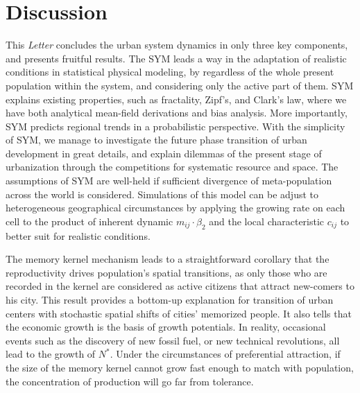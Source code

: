 \documentclass[reprint,unsortedaddress,amsmath,amssymb,aps,prl,showkeys]{revtex4-2}
\begin{document}
\section{Discussion}
This \emph{Letter} concludes the urban system dynamics in only three key components, and presents fruitful results. The SYM leads a way in the adaptation of realistic conditions in statistical physical modeling, by regardless of the whole present population within the system, and considering only the active part of them. SYM explains existing properties, such as fractality, Zipf's, and Clark's law, where we have both analytical mean-field derivations and bias analysis. More importantly, SYM predicts regional trends in a probabilistic perspective. With the simplicity of SYM, we manage to investigate the future phase transition of urban development in great details, and explain dilemmas of the present stage of urbanization through the competitions for systematic resource and space. The assumptions of SYM are well-held if sufficient divergence of meta-population across the world is considered. Simulations of this model can be adjust to heterogeneous geographical circumstances by applying the growing rate on each cell to the product of inherent dynamic $m_{ij}\cdot \beta_2$ and the local characteristic $c_{ij}$ to better suit for realistic conditions.

The memory kernel mechanism leads to a straightforward corollary that the reproductivity drives population's spatial transitions, as only those who are recorded in the kernel are considered as active citizens that attract new-comers to his city. This result provides a bottom-up explanation for transition of urban centers with stochastic spatial shifts of cities' memorized people. It also tells that the economic growth is the basis of growth potentials. In reality, occasional events such as the discovery of new fossil fuel, or new technical revolutions, all lead to the growth of $N^*$. Under the circumstances of preferential attraction, if the size of the memory kernel cannot grow fast enough to match with population, the concentration of production will go far from tolerance. 
\end{document}
